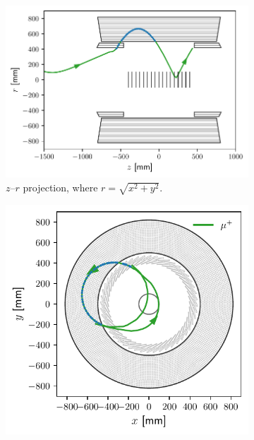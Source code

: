 \begin{figure}
    \centering
    \begin{subfigure}{0.56\textwidth}
        \centering
        \includegraphics[width=\textwidth]{chapter6/mu+_track_zy.pdf}
        \caption{$z$--$r$ projection, where $r = \sqrt{x^2+y^2}$.}
    \end{subfigure}
    \hfill
    \begin{subfigure}{0.43\textwidth}
        \centering
        \includegraphics[width=\textwidth]{chapter6/mu+_track_xy.pdf}

\end{subfigure}
\end{figure}
